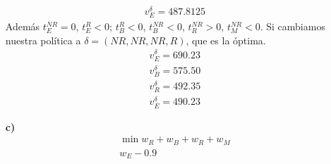 \documentclass[twoside]{article}
\begin{document}
\begin{ejercicio}{1}
\begin{solucion}
\begin{itemize}
\begin{align*}
v^\delta_E=487.8125
\end{align*}
Además $t_E^{NR} = 0$, $t_E^R <0$; $t_B^{R}<0$, $t_B^{NR}<0$, $t^{NR}_R >0$, $t^{NR}_M <0$. Si cambiamos nuestra política a $\delta = (NR, NR, NR, R)$, que es la óptima. \begin{align*}
v^\delta_E=690.23\\
v^\delta_B=575.50\\
v^\delta_R=492.35\\
v^\delta_E=490.23
\end{align*}
\item[\textbf{c)}]
\begin{align*}
\min w_R+w_B+w_R+w_M\\
w_E - 0.9
\end{align*}
\end{itemize}
\end{solucion}
\end{ejercicio}
\end{document}
